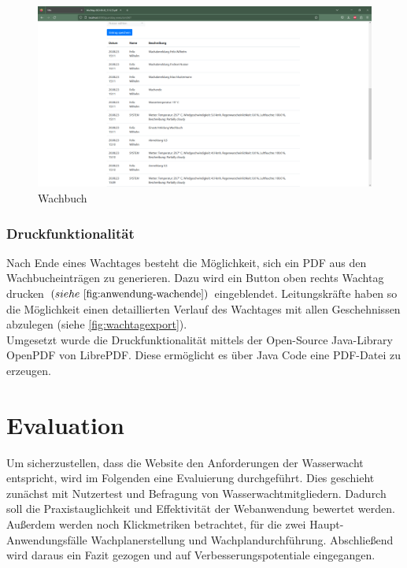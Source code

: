 \documentclass[fontsize=12pt,openright,oneside,paper=a4,BCOR=1cm]{scrbook}
\begin{document}
\begin{figure}[H]
  \centering
    \includegraphics[width=0.7\linewidth]{Anlagen/Anwendung/8-6WachtagWachbuchLog.png}
    \caption{Wachbuch}
  \label{fig:anwendung-wachbuch}
\end{figure}


\subsection{Druckfunktionalität}

Nach Ende eines Wachtages besteht die M\"oglichkeit, sich ein PDF aus den Wachbucheintr\"agen zu generieren. Dazu wird ein Button oben rechts \glqq Wachtag drucken\grqq{} $(siehe~\ref{fig:anwendung-wachende})$ eingeblendet. Leitungskr\"afte haben so die M\"oglichkeit einen detaillierten Verlauf des Wachtages mit allen Geschehnissen abzulegen (siehe \ref{fig:wachtagexport}). \\
Umgesetzt wurde die Druckfunktionalit\"at mittels der Open-Source Java-Library OpenPDF von LibrePDF. Diese erm\"oglicht es \"uber Java Code eine PDF-Datei zu erzeugen.\\



%
%

\newpage
\chapter{Evaluation}

Um sicherzustellen, dass die Website den Anforderungen der Wasserwacht entspricht, wird im Folgenden eine Evaluierung durchgeführt. Dies geschieht zunächst mit Nutzertest und Befragung von Wasserwachtmitgliedern. Dadurch soll die Praxistauglichkeit und Effektivität der Webanwendung bewertet werden. Außerdem werden noch \glqq Klickmetriken\grqq{} betrachtet, für die zwei Haupt-Anwendungsfälle Wachplanerstellung und Wachplandurchführung. Abschließend wird daraus ein Fazit gezogen und auf Verbesserungspotentiale eingegangen. 
\end{document}
